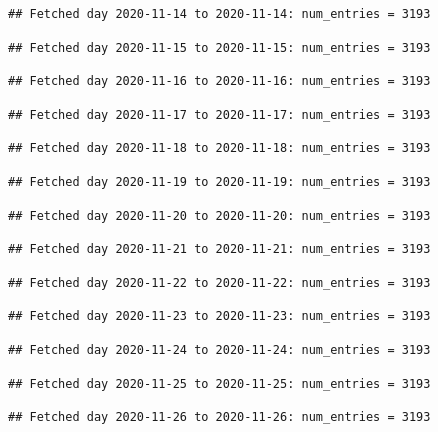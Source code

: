 \documentclass[]{article}
\begin{document}
\begin{verbatim}
## Fetched day 2020-11-14 to 2020-11-14: num_entries = 3193
\end{verbatim}

\begin{verbatim}
## Fetched day 2020-11-15 to 2020-11-15: num_entries = 3193
\end{verbatim}

\begin{verbatim}
## Fetched day 2020-11-16 to 2020-11-16: num_entries = 3193
\end{verbatim}

\begin{verbatim}
## Fetched day 2020-11-17 to 2020-11-17: num_entries = 3193
\end{verbatim}

\begin{verbatim}
## Fetched day 2020-11-18 to 2020-11-18: num_entries = 3193
\end{verbatim}

\begin{verbatim}
## Fetched day 2020-11-19 to 2020-11-19: num_entries = 3193
\end{verbatim}

\begin{verbatim}
## Fetched day 2020-11-20 to 2020-11-20: num_entries = 3193
\end{verbatim}

\begin{verbatim}
## Fetched day 2020-11-21 to 2020-11-21: num_entries = 3193
\end{verbatim}

\begin{verbatim}
## Fetched day 2020-11-22 to 2020-11-22: num_entries = 3193
\end{verbatim}

\begin{verbatim}
## Fetched day 2020-11-23 to 2020-11-23: num_entries = 3193
\end{verbatim}

\begin{verbatim}
## Fetched day 2020-11-24 to 2020-11-24: num_entries = 3193
\end{verbatim}

\begin{verbatim}
## Fetched day 2020-11-25 to 2020-11-25: num_entries = 3193
\end{verbatim}

\begin{verbatim}
## Fetched day 2020-11-26 to 2020-11-26: num_entries = 3193
\end{verbatim}
\end{document}
